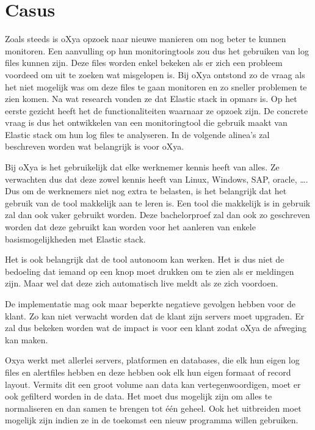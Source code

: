 
\chapter{Casus}
\label{ch:casus}
Zoals steeds is oXya opzoek naar nieuwe manieren om nog beter te kunnen monitoren. Een aanvulling op hun monitoringtools zou dus het gebruiken van log files kunnen zijn. Deze files worden enkel bekeken als er zich een probleem voordeed om uit te zoeken wat misgelopen is.
Bij oXya ontstond zo de vraag als het niet mogelijk was om deze files te gaan monitoren en zo sneller problemen te zien komen.
Na wat research vonden ze dat Elastic stack in opmars is. Op het eerste gezicht heeft het de functionaliteiten waarnaar ze opzoek zijn. De concrete vraag is dus het ontwikkelen van een monitoringtool die gebruik maakt van Elastic stack om hun log files te analyseren.
In de volgende alinea's zal beschreven worden wat belangrijk is voor oXya.

Bij oXya is het gebruikelijk dat elke werknemer kennis heeft van alles. Ze verwachten dus dat deze zowel kennis heeft van Linux, Windows, SAP, oracle, \dots. Dus om de werknemers niet nog extra te belasten, is het belangrijk dat het gebruik van de tool makkelijk aan te leren is. 
Een tool die makkelijk is in gebruik zal dan ook vaker gebruikt worden. Deze bachelorproef zal dan ook zo geschreven worden dat deze gebruikt kan worden voor het aanleren van enkele basismogelijkheden met Elastic stack.

Het is ook belangrijk dat de tool autonoom kan werken. Het is dus niet de bedoeling dat iemand op een knop moet drukken om te zien als er meldingen zijn. Maar wel dat deze zich automatisch live meldt als ze zich voordoen. 

De implementatie mag ook maar beperkte negatieve gevolgen hebben voor de klant. Zo kan niet verwacht worden dat de klant zijn servers moet upgraden. Er zal dus bekeken worden wat de impact is voor een klant zodat oXya de afweging kan maken.

Oxya werkt met allerlei servers, platformen en databases, die elk hun eigen log files en alertfiles hebben en deze hebben ook elk hun eigen formaat of record layout. Vermits dit een groot volume aan data kan vertegenwoordigen, moet er ook gefilterd worden in de data. Het moet dus mogelijk zijn om alles te normaliseren en dan samen te brengen tot één geheel. Ook het uitbreiden moet mogelijk zijn indien ze in de toekomst een nieuw programma willen gebruiken.

